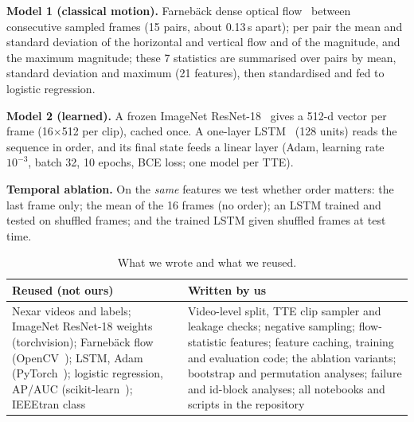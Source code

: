 \documentclass[conference]{IEEEtran}
\begin{document}
\textbf{Model 1 (classical motion).} Farneb\"ack dense optical flow~\cite{farneback2003} between consecutive sampled frames (15 pairs, about 0.13\,s apart); per pair the mean and standard deviation of the horizontal and vertical flow and of the magnitude, and the maximum magnitude;
these 7 statistics are summarised over pairs by mean, standard deviation and maximum (21 features), then standardised and fed to logistic regression.

\textbf{Model 2 (learned).} A frozen ImageNet ResNet-18~\cite{he2016resnet} gives a 512-d vector per frame (16$\times$512 per clip), cached once. A one-layer LSTM~\cite{hochreiter1997lstm} (128 units) reads the sequence in order, and its final state feeds a linear layer
(Adam, learning rate $10^{-3}$, batch 32, 10 epochs, BCE loss; one model per TTE).

\textbf{Temporal ablation.} On the \emph{same} features we test whether order matters: the last frame only; the mean of the 16 frames (no order); an LSTM trained and tested on shuffled frames; and the trained LSTM given shuffled frames at test time.

\begin{table}[t]
\caption{What we wrote and what we reused.}
\label{tab:reuse}
\centering\footnotesize
\begin{tabular}{@{}p{}p{}@{}}
\toprule
\textbf{Reused (not ours)} & \textbf{Written by us} \\
\midrule
Nexar videos and labels; ImageNet ResNet-18 weights (torchvision); Farneb\"ack flow (OpenCV~\cite{bradski2000opencv}); LSTM, Adam (PyTorch~\cite{paszke2019pytorch}); logistic regression, AP/AUC (scikit-learn~\cite{pedregosa2011sklearn}); IEEEtran class
& Video-level split, TTE clip sampler and leakage checks; negative sampling; flow-statistic features; feature caching, training and evaluation code; the ablation variants; bootstrap and permutation analyses; failure and id-block analyses; all notebooks and scripts in the repository \\
\bottomrule
\end{tabular}
\end{table}
\end{document}

